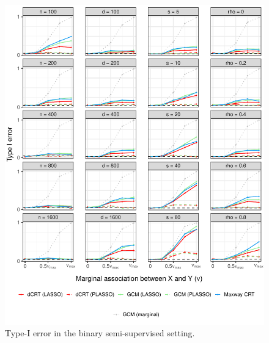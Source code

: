\documentclass[12pt]{article}
\theoremstyle{definition}
\theoremstyle{remark}
\begin{document}
\begin{figure}[!ht]
	\centering
	\includegraphics[scale = 1]{figures/binomial_semi_supervised_setting_null.pdf}
	\caption{Type-I error in the binary semi-supervised setting.}
	\label{fig:binomial_semi-supervised_null}
\end{figure}
\end{document}
